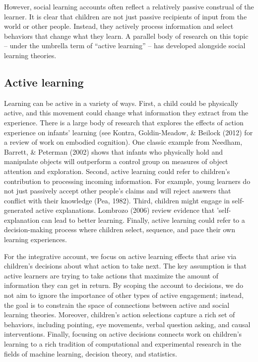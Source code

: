 \documentclass[oneside]{report}
\begin{document}
However, social learning accounts often reflect a relatively passive
construal of the learner. It is clear that children are not just passive
recipients of input from the world or other people. Instead, they
actively process information and select behaviors that change what they
learn. A parallel body of research on this topic -- under the umbrella
term of ``active learning'' -- has developed alongside social learning
theories.

\subsection{Active learning}\label{active-learning}

Learning can be active in a variety of ways. First, a child could be
physically active, and this movement could change what information they
extract from the experience. There is a large body of research that
explores the effects of action experience on infants' learning (see
Kontra, Goldin-Meadow, \& Beilock (2012) for a review of work on
embodied cognition). One classic example from Needham, Barrett, \&
Peterman (2002) shows that infants who physically hold and manipulate
objects will outperform a control group on measures of object attention
and exploration. Second, active learning could refer to children's
contribution to processing incoming information. For example, young
learners do not just passively accept other people's claims and will
reject answers that conflict with their knowledge (Pea, 1982). Third,
children might engage in self-generated active explanations. Lombrozo
(2006) review evidence that 'self-explanation can lead to better
learning. Finally, active learning could refer to a decision-making
process where children select, sequence, and pace their own learning
experiences.

For the integrative account, we focus on active learning effects that
arise via children's decisions about what action to take next. The key
assumption is that active learners are trying to take actions that
maximize the amount of information they can get in return. By scoping
the account to decisions, we do not aim to ignore the importance of
other types of active engagement; instead, the goal is to constrain the
space of connections between active and social learning theories.
Moreover, children's action selections capture a rich set of behaviors,
including pointing, eye movements, verbal question asking, and causal
interventions. Finally, focusing on active decisions connects work on
children's learning to a rich tradition of computational and
experimental research in the fields of machine learning, decision
theory, and statistics.
\end{document}
